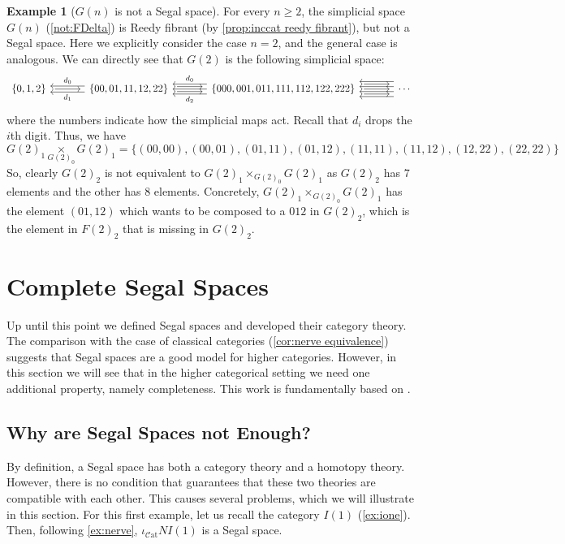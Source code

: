 \documentclass[11pt, a4paper]{amsart}
\newcommand{\Cat}{\mathscr{C}\mathrm{at}}
\newcommand{\inccat}{\iota_{\Cat}}
\theoremstyle{definition}
\newtheorem{example}[equation]{Example}
\theoremstyle{remark}
\numberwithin{equation}{section}
\begin{document}
 \begin{example}[$G(n)$ is not a Segal space] \label{ex:gn not a segal space}
  For every $n \geq 2$, the simplicial space $G(n)$ (\cref{not:FDelta}) is Reedy fibrant (by \cref{prop:inccat reedy fibrant}), but not a Segal space. Here we explicitly consider the case $n=2$, and the general case is analogous. We can directly see that $G(2)$ is the following simplicial space:
  \[
   \begin{tikzcd}[column sep=1.2cm]
    \{0,1,2 \} \arrow[r, shorten >=1ex,shorten <=1ex]
    & \{00,01,11,12,22 \} 
    \arrow[l, shift left=1.2, "d_1"] \arrow[l, shift right=1.2, "d_0"'] 
    \arrow[r, shift right, shorten >=1ex,shorten <=1ex ] \arrow[r, shift left, shorten >=1ex,shorten <=1ex] 
    & \{ 000,001,011,111,112,122,222 \} 
    \arrow[l] \arrow[l, shift left=2, "d_2"] \arrow[l, shift right=2, "d_0"'] 
    \arrow[r, shorten >=1ex,shorten <=1ex] \arrow[r, shift left=2, shorten >=1ex,shorten <=1ex] 
    \arrow[r, shift right=2, shorten >=1ex,shorten <=1ex]
    & \cdots 
    \arrow[l, shift right=1] \arrow[l, shift left=1] \arrow[l, shift right=3] \arrow[l, shift left=3] 
   \end{tikzcd}
  \]
  where the numbers indicate how the simplicial maps act. Recall that $d_i$ drops the $i$th digit. Thus, we have
  \[G(2)_1 \underset{G(2)_0}{\times} G(2)_1 = \{ (00,00),(00,01),(01,11),(01,12),(11,11),(11,12),(12,22),(22,22)\}\]
  So, clearly $G(2)_2$ is not equivalent to $G(2)_1 \times_{G(2)_0} G(2)_1$ as $G(2)_2$ has $7$ elements and the other has $8$ elements. Concretely, $G(2)_1 \times_{G(2)_0} G(2)_1$ has the element $(01,12)$ which wants to be composed to a $012$ in $G(2)_2$, which is the element in $F(2)_2$ that is missing in $G(2)_2$.
 \end{example}
 
 \section{Complete Segal Spaces} \label{section:css}
 Up until this point we defined Segal spaces and developed their category theory. The comparison with the case of classical categories (\cref{cor:nerve equivalence}) suggests that Segal spaces are a good model for higher categories. However, in this section we will see that in the higher categorical setting we need one additional property, namely completeness. This work is fundamentally based on \cite[Section 3, Section 6]{rezk2001css}.
 
\subsection{Why are Segal Spaces not Enough?} \label{subsec:why css}
By definition, a Segal space has both a category theory and a homotopy theory. However, there is no condition that guarantees that these two theories are compatible with each other. This causes several problems, which we will illustrate in this section. For this first example, let us recall the category $I(1)$ (\cref{ex:ione}). Then, following \cref{ex:nerve}, $\inccat N I(1)$ is a Segal space.
\end{document}
